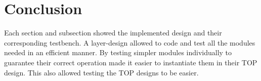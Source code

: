 \documentclass[12pt]{article}
\begin{document}
\section{Conclusion}
Each section and subsection showed the implemented design and their corresponding testbench.  A layer-design allowed to code and test all the modules needed in an efficient manner.  By testing simpler modules individually to guarantee their correct operation made it easier to instantiate them in their TOP design.  This also allowed testing the TOP designs to be easier.
\end{document}
